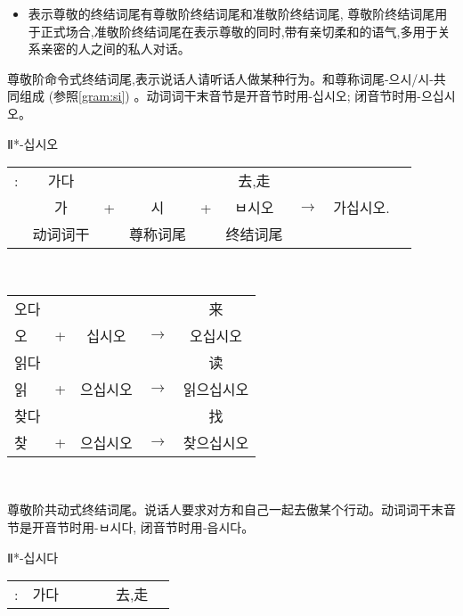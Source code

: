 \begin{grammar}
\begin{grammarsect}[尊敬阶终结词尾]
\begin{itemize}
            \item 表示尊敬的终结词尾有尊敬阶终结词尾和准敬阶终结词尾, 尊敬阶终结词尾用于正式场合,准敬阶终结词尾在表示尊敬的同时,带有亲切柔和的语气,多用于关系亲密的人之间的私人对话。
        \end{itemize}
    \end{grammarsect}
    \begin{grammarsect}[\kr -ㅂ시오]\label{gram:bsio}
        \begin{itemize}
            \item 尊敬阶命令式终结词尾,表示说话人请听话人做某种行为。和尊称词尾{\kr -으시/시-}共同组成 (参照\ref{gram:si}) 。动词词干末音节是开音节时用-십시오;
闭音节时用{\kr -으십시오}。 
            {\color{gray} \item Ⅱ*{\kr -십시오}} 
        \end{itemize}
        \begin{tabular}{ccccccccc}
            \kr \ruby{例}{예}:&\kr 가다&&&&去,走\\
            &\kr 가&+&\kr 시&+&\kr ㅂ시오&$\to$&\kr 가십시오.\\\cline{2-2}\cline{4-4}\cline{6-6}
            &动词词干&&尊称词尾&&终结词尾
        \end{tabular}\\
        \begin{tabular}{lcccc}
            \kr 오다 &&&&来\\
            \kr 오 &+ &\kr 십시오&$\to$&\kr 오십시오\\
            \kr 읽다 &&&&读\\
            \kr 읽 &+&\kr 으십시오&$\to$&\kr 읽으십시오\\
            \kr 찾다 &&&&找 \\
            \kr 찾 &+ &\kr 으십시오&$\to$&\kr 찾으십시오 
        \end{tabular}\\
    \end{grammarsect}
    \begin{grammarsect}[\kr -(으){}ㅂ시다]
        \begin{itemize}
            \item 尊敬阶共动式终结词尾。说话人要求对方和自己一起去傲某个行动。动词词干末音节是开音节时用{\kr -ㅂ시다}, 闭音节时用{\kr -읍시다}。
            {\color{gray} \item Ⅱ*{\kr -십시다}} 
        \end{itemize}
        \begin{tabular}{ccccccc}
            \kr \ruby{例}{예}:&\kr 가다&&&&去,走\\

\end{tabular}
\end{grammarsect}
\end{grammar}
